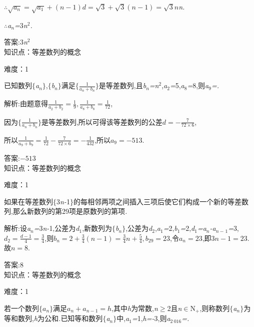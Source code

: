 \documentclass{article} %
\begin{document}
$\therefore \sqrt{a_n} = \sqrt{a_1} + (n-1)d = \sqrt{3}+\sqrt{3}(n-1) = \sqrt{3} n$\textit{n.}

\textit{$\therefore$a${}_{n}$=}3\textit{n}${}^{2}$\textit{.}

 答案:3\textit{n}${}^{2}$ \\

知识点：等差数列的概念

难度：1

 已知数列$\mathrm{\{}$\textit{a${}_{n}$}$\mathrm{\}}$,$\mathrm{\{}$\textit{b${}_{n}$}$\mathrm{\}}$满足$\{\frac{1}{a_n+b_n}\}$是等差数列,且\textit{b${}_{n}$=n}${}^{2}$,\textit{a}${}_{2}$\textit{=}5,\textit{a}${}_{8}$\textit{=}8,则\textit{a}${}_{9}$\textit{=\underbar{　　　　　　　}.~}

 解析:由题意得$\frac{1}{a_2+b_2} = \frac{1}{9}, \frac{1}{a_8+b_8} = \frac{1}{72}$,

因为$\{\frac{1}{a_n+b_n}\}$是等差数列,所以可得该等差数列的公差$d=-\frac{7}{72\times 6}$,

所以$\frac{1}{a_9+b_9} = \frac{1}{72}-\frac{7}{72\times 6} = -\frac{1}{432}$,所以$a_9 = -513$.

 答案:$-513$ \\

知识点：等差数列的概念

难度：1

 如果在等差数列$\mathrm{\{}$3\textit{n-}1$\mathrm{\}}$的每相邻两项之间插入三项后使它们构成一个新的等差数列,那么新数列的第29项是原数列的第\textit{\underbar{　　　　　}}项\textit{.~}

 解析:设\textit{a${}_{n}$=}3\textit{n-}1,公差为\textit{d}${}_{1}$,新数列为$\mathrm{\{}$\textit{b${}_{n}$}$\mathrm{\}}$,公差为\textit{d}${}_{2}$,\textit{a}${}_{1}$\textit{=}2,\textit{b}${}_{1}$\textit{=}2,\textit{d}${}_{1}$\textit{=a${}_{n}$-a${}_{n-}$}${}_{1}$\textit{=}3,$d_2 = \frac{d-1}{4} = \frac{3}{4}$,则$b_n = 2+\frac{3}{4}(n-1) = \frac{3}{4}n+\frac{5}{4},b_{29} = 23 $,令$a_n = 23$,即$3n-1=23$.故$n=8$.

 答案:8 \\

知识点：等差数列的概念

难度：1

 若一个数列$\{a_n\}$满足$a_n+a_{n-1} = h$,其中\textit{h}为常数,\textit{n}$\mathrm{\ge}$2且\textit{n}$\mathrm{\in}$N\textit{${}_{+}$},则称数列$\mathrm{\{}$\textit{a${}_{n}$}$\mathrm{\}}$为等和数列,\textit{h}为公和\textit{.}已知等和数列$\mathrm{\{}$\textit{a${}_{n}$}$\mathrm{\}}$中,\textit{a}${}_{1}$\textit{=}1,\textit{h=-}3,则\textit{a}${}_{2\ 016}$\textit{=\underbar{　　　　　}.~}
\end{document}
